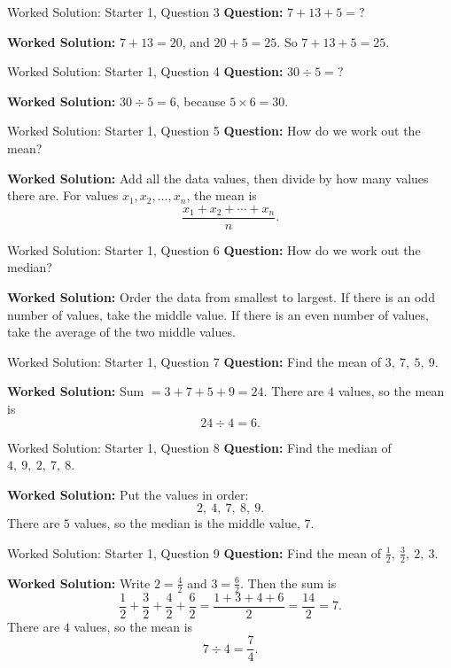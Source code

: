 \documentclass{beamer}
\begin{document}
\begin{frame}{Worked Solution: Starter 1, Question 3}
\small
\textbf{Question:} \(7+13+5=\mathord{?}\)

\smallskip
\textbf{Worked Solution:} \(7+13=20\), and \(20+5=25\). So \(7+13+5=25\).
\end{frame}

\begin{frame}{Worked Solution: Starter 1, Question 4}
\small
\textbf{Question:} \(30 \div 5=\mathord{?}\)

\smallskip
\textbf{Worked Solution:} \(30 \div 5 = 6\), because \(5 \times 6 = 30\).
\end{frame}

\begin{frame}{Worked Solution: Starter 1, Question 5}
\small
\textbf{Question:} How do we work out the mean?

\smallskip
\textbf{Worked Solution:} Add all the data values, then divide by how many values there are. For values \(x_1,x_2,\dots,x_n\), the mean is
\[
\frac{x_1+x_2+\cdots+x_n}{n}.
\]
\end{frame}

\begin{frame}{Worked Solution: Starter 1, Question 6}
\small
\textbf{Question:} How do we work out the median?

\smallskip
\textbf{Worked Solution:} Order the data from smallest to largest. If there is an odd number of values, take the middle value. If there is an even number of values, take the average of the two middle values.
\end{frame}

\begin{frame}{Worked Solution: Starter 1, Question 7}
\small
\textbf{Question:} Find the mean of \(3,\ 7,\ 5,\ 9\).

\smallskip
\textbf{Worked Solution:} Sum \(=3+7+5+9=24\). There are \(4\) values, so the mean is
\[
24 \div 4 = 6.
\]
\end{frame}

\begin{frame}{Worked Solution: Starter 1, Question 8}
\small
\textbf{Question:} Find the median of \(4,\ 9,\ 2,\ 7,\ 8\).

\smallskip
\textbf{Worked Solution:} Put the values in order:
\[
2,\ 4,\ 7,\ 8,\ 9.
\]
There are \(5\) values, so the median is the middle value, \(7\).
\end{frame}

\begin{frame}{Worked Solution: Starter 1, Question 9}
\small
\textbf{Question:} Find the mean of \(\frac{1}{2},\ \frac{3}{2},\ 2,\ 3\).

\smallskip
\textbf{Worked Solution:} Write \(2=\frac42\) and \(3=\frac62\). Then the sum is
\[
\frac12+\frac32+\frac42+\frac62=\frac{1+3+4+6}{2}=\frac{14}{2}=7.
\]
There are \(4\) values, so the mean is
\[
7 \div 4 = \frac74.
\]
\end{frame}
\end{document}
